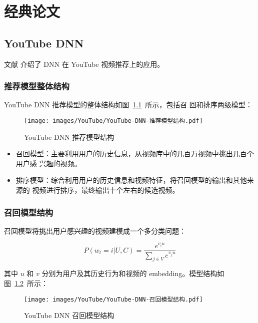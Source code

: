 \chapter{经典论文}
\section{YouTube DNN}

文献  介绍了 DNN 在 YouTube 视频推荐上的应用。

\subsection{推荐模型整体结构}
YouTube DNN 推荐模型的整体结构如图~\ref{fig:youtube-dnn-structure}~所示，包括召
回和排序两级模型：

\begin{figure}[ht]
  \centering
  \texttt{[image: images/YouTube/YouTube-DNN-推荐模型结构.pdf]}
  \caption{YouTube DNN 推荐模型结构}\label{fig:youtube-dnn-structure}
\end{figure}

\begin{itemize}
  \item 召回模型：主要利用用户的历史信息，从视频库中的几百万视频中挑出几百个用户感
    兴趣的视频。
  \item 排序模型：综合利用用户的历史信息和视频特征，将召回模型的输出和其他来源的
    视频进行排序，最终输出十个左右的候选视频。
\end{itemize}

\subsection{召回模型结构}
召回模型将挑出用户感兴趣的视频建模成一个多分类问题：

\begin{equation}
  P(w_t=i|U, C) = \frac{e^{v_i u}}{\sum_{j \in V} e^{v_j u}}
\end{equation}

其中 $u$ 和 $v$ 分别为用户及其历史行为和视频的 embedding。模型结构如
图~\ref{fig:youtube-dnn-retrieval-structure}~所示：

\begin{figure}[ht]
  \centering
  \texttt{[image: images/YouTube/YouTube-DNN-召回模型结构.pdf]}
  \caption{YouTube DNN 召回模型结构}\label{fig:youtube-dnn-retrieval-structure}
\end{figure}

